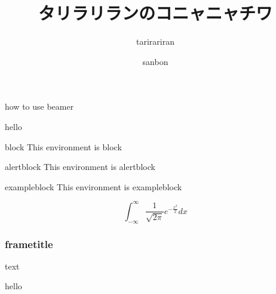 \documentclass[unicode]{beamer}
\title{タリラリランのコニャニャチワ}
\subtitle{tarirariran}
\author{sanbon}
\institute{chuo junior high school}
\begin{document}
	\begin{frame}{how to use beamer}
		\titlepage
	\end{frame}
	
	\begin{frame}{hello}
		\begin{block}{block}
			This environment is block
		\end{block}

		\begin{alertblock}{alertblock}
			This environment is alertblock
		\end{alertblock}

		\begin{exampleblock}{exampleblock}
			This environment is exampleblock
		\end{exampleblock}
	\end{frame}

	\begin{frame}
	\[ \int^\infty_{-\infty}\frac{1}{\sqrt{2\pi}}e^{-\frac{x^2}{2}} dx \]
		\frametitle{frametitle}
		text
	\end{frame}


	\begin{frame}{hello}
		
	\end{frame}
\end{document}
